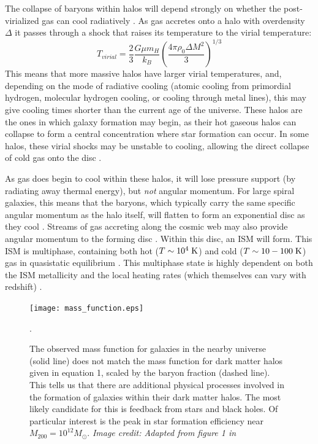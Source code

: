 The collapse of baryons within halos will depend strongly on whether the
post-virialized gas can cool radiatively \citep{Rees1977}.  As gas accretes onto
a halo with overdensity $\Delta$ it passes through a shock that raises its
temperature to the virial temperature:
\begin{equation}
    T_{virial} = \frac{2}{3}\frac{G\mu m_H}{k_B}\left({\frac{4\pi\rho_0\Delta
    M^2}{3}}\right)^{1/3}
\end{equation}
This means that more massive halos have larger virial temperatures, and,
depending on the mode of radiative cooling (atomic cooling from primordial
hydrogen, molecular hydrogen cooling, or cooling through metal lines), this may
give cooling times shorter than the current age of the universe.  These halos
are the ones in which galaxy formation may begin, as their hot gaseous halos can
collapse to form a central concentration where star formation can occur.  In
some halos, these virial shocks may be unstable to cooling, allowing the direct
collapse of cold gas onto the disc \citep{Birnboim2003}.  


As gas does begin to cool within these halos, it will lose pressure support (by
radiating away thermal energy), but {\it not} angular momentum.  For large
spiral galaxies, this means that the baryons, which typically carry the same
specific angular momentum as the halo itself, will flatten to form an
exponential disc as they cool \citep{Fall1980,Mo1998}.  Streams of gas
accreting along the cosmic web may also provide angular momentum to the forming
disc \citep{Dekel2006}.  Within this disc, an ISM will form.  This ISM is
multiphase, containing both hot ($T\sim10^4\;\rm{K}$) and cold
($T\sim10-100\;\rm{K}$) gas in quasistatic equilibrium \citep{McKee1977}.  This
multiphase state is highly dependent on both the ISM metallicity and the local
heating rates (which themselves can vary with redshift)
\citep{Field1969,Wolfire1995,Norman1997}.
\begin{figure}
    \texttt{[image: mass\_function.eps]}
    \caption[Galaxy mass function]{The observed mass function for galaxies in
    the nearby universe (solid line) does not match the mass function for dark
    matter halos given in equation 1, scaled by the baryon fraction (dashed
    line).  This tells us that there are additional physical processes involved
    in the formation of galaxies within their dark matter halos.  The most
    likely candidate for this is feedback from stars and black holes.  Of
    particular interest is the peak in star formation efficiency near
    $M_{200}=10^{12}M_\odot$.  \textit{Image credit: Adapted from figure 1 in
    \citet{Ferrero2012}}}.
\end{figure}

